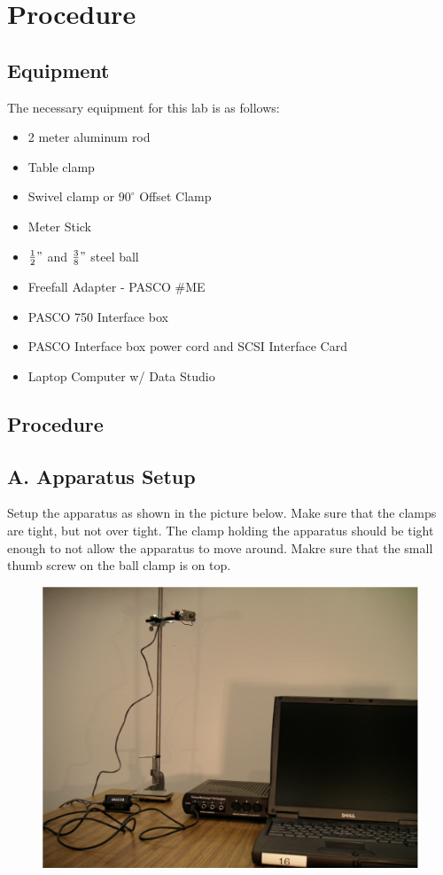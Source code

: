 \chapter{Procedure}
\section{Equipment}
The necessary equipment for this lab is as follows:
\begin{itemize}
  \item 2 meter aluminum rod
  \item Table clamp
  \item Swivel clamp or $90^\circ$ Offset Clamp
  \item Meter Stick
  \item $\frac{1}{2}"$ and $\frac{3}{8}"$ steel ball
  \item Freefall Adapter - PASCO \#ME
  \item PASCO 750 Interface box
  \item PASCO Interface box power cord and SCSI Interface Card
  \item Laptop Computer w/ Data Studio
\end{itemize}

\section{Procedure}

\section{A. Apparatus Setup}

  Setup the apparatus as shown in the picture below. Make sure that the clamps are tight,
but not over tight. The clamp holding the apparatus should be tight enough to not allow
the apparatus to move around. Makre sure that the small thumb screw on the ball
clamp is on top.

\newpage 

\begin{figure}[htbp]
  \centerline{\includegraphics[scale=0.3]{resources/photo1.jpg}}
\end{figure}

